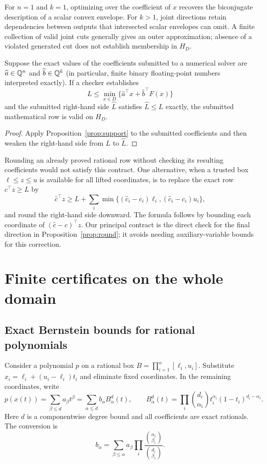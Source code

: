 For $n=1$ and $k=1$, optimizing over the coefficient of $x$ recovers the
biconjugate description of a scalar convex envelope. For $k>1$, joint
directions retain dependencies between outputs that intersected scalar
envelopes can omit. A finite collection of valid joint cuts generally
gives an outer approximation; absence of a violated generated cut does
not establish membership in $H_D$.

\begin{proposition}\label{prop:round}
Suppose the exact values of the coefficients submitted to a numerical
solver are $\widehat a\in\mathbb Q^n$ and $\widehat b\in\mathbb Q^k$ (in particular,
finite binary floating-point numbers interpreted exactly). If a checker
establishes
\[
L\le\min_{x\in D}
\{\widehat a^\top x+\widehat b^\top F(x)\}
\]
and the submitted right-hand side $\widehat L$ satisfies
$\widehat L\le L$ exactly, the submitted mathematical row is valid on
$H_D$.
\end{proposition}
\begin{proof}
Apply Proposition~\ref{prop:support} to the submitted coefficients and
then weaken the right-hand side from $L$ to $\widehat L$.
\end{proof}

Rounding an already proved rational row without checking its resulting
coefficients would not satisfy this contract. One alternative, when a
trusted box $\ell\le z\le u$ is available for all lifted coordinates,
is to replace the exact row $c^\top z\ge L$ by
\[
\widehat c^\top z\ge
L+\sum_i\min\{(\widehat c_i-c_i)\ell_i,
                 (\widehat c_i-c_i)u_i\},
\]
and round the right-hand side downward. The formula follows by bounding
each coordinate of $(\widehat c-c)^\top z$. Our principal contract is
the direct check for the final direction in
Proposition~\ref{prop:round}; it avoids needing auxiliary-variable bounds
for this correction.

\section{Finite certificates on the whole domain}\label{sec:numerics}

\subsection{Exact Bernstein bounds for rational polynomials}

Consider a polynomial $p$ on a rational box
$B=\prod_{i=1}^n[\ell_i,u_i]$. Substitute
$x_i=\ell_i+(u_i-\ell_i)t_i$ and eliminate fixed coordinates. In the
remaining coordinates, write
\[
p(x(t))=\sum_{\beta\le d}a_\beta t^\beta
       =\sum_{\alpha\le d}b_\alpha B_\alpha^d(t),\qquad
B_\alpha^d(t)=\prod_i
\binom{d_i}{\alpha_i}t_i^{\alpha_i}(1-t_i)^{d_i-\alpha_i}.
\]
Here $d$ is a componentwise degree bound and all coefficients are exact
rationals. The conversion is
\begin{equation}\label{eq:bernstein-conversion}
b_\alpha=\sum_{\beta\le\alpha}a_\beta
\prod_i\frac{\binom{\alpha_i}{\beta_i}}{\binom{d_i}{\beta_i}}.
\end{equation}

